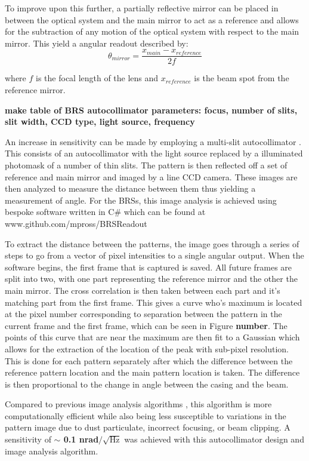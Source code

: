 \documentclass [12pt, proquest]{uwthesis}[2019]
\begin{document}
To improve upon this further, a partially reflective mirror can be placed in between the optical system and the main mirror to act as a reference and allows for the subtraction of any motion of the optical system with respect to the main mirror. This yield a angular readout described by:
\[\theta_{mirror}=\frac{x_{main}-x_{reference}}{2f}\]

where $f$ is the focal length of the lens and $x_{reference}$ is the beam spot from the reference mirror.

\textbf{make table of BRS autocollimator parameters: focus, number of slits, slit width, CCD type, light source, frequency}

An increase in sensitivity can be made by employing a multi-slit autocollimator \cite{MSA}. This consists of an autocollimator with the light source replaced by a illuminated photomask of a number of thin slits. The pattern is then reflected off a set of reference and main mirror and imaged by a line CCD camera. These images are then analyzed to measure the distance between them thus yielding a measurement of angle. For the BRSs, this image analysis is achieved using bespoke software written in C\# which can be found at www.github.com/mpross/BRSReadout

To extract the distance between the patterns, the image goes through a series of steps to go from a vector of pixel intensities to a single angular output. When the software begins, the first frame that is captured is saved. All future frames are split into two, with one part representing the reference mirror and the other the main mirror. The cross correlation is then taken between each part and it's matching part from the first frame. This gives a curve who's maximum is located at the pixel number corresponding to separation between the pattern in the current frame and the first frame, which can be seen in Figure \textbf{number}. The points of this curve that are near the maximum are then fit to a Gaussian which allows for the extraction of the location of the peak with sub-pixel resolution. This is done for each pattern separately after which the difference between the reference pattern location and the main pattern location is taken. The difference is then proportional to the change in angle between the casing and the beam.

Compared to previous image analysis algorithms \cite{MSAPaper}, this algorithm is more computationally efficient while also being less susceptible to variations in the pattern image due to dust particulate, incorrect focusing, or beam clipping. A sensitivity of \textbf{$\sim$ 0.1 nrad$/\sqrt{\text{Hz}}$} was achieved with this autocollimator design and image analysis algorithm.
\end{document}
